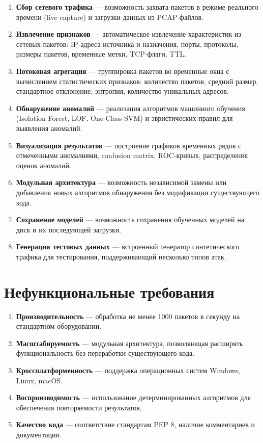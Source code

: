 \begin{enumerate}[label={\bfseries RF-\arabic*:}]
    \item \textbf{Сбор сетевого трафика} — возможность захвата пакетов в режиме реального времени (live capture) и загрузки данных из PCAP-файлов.
    \item \textbf{Извлечение признаков} — автоматическое извлечение характеристик из сетевых пакетов: IP-адреса источника и назначения, порты, протоколы, размеры пакетов, временные метки, TCP-флаги, TTL.
    \item \textbf{Потоковая агрегация} — группировка пакетов во временные окна с вычислением статистических признаков: количество пакетов, средний размер, стандартное отклонение, энтропия, количество уникальных адресов.
    \item \textbf{Обнаружение аномалий} — реализация алгоритмов машинного обучения (Isolation Forest, LOF, One-Class SVM) и эвристических правил для выявления аномалий.
    \item \textbf{Визуализация результатов} — построение графиков временных рядов с отмеченными аномалиями, confusion matrix, ROC-кривых, распределения оценок аномалий.
    \item \textbf{Модульная архитектура} — возможность независимой замены или добавления новых алгоритмов обнаружения без модификации существующего кода.
    \item \textbf{Сохранение моделей} — возможность сохранения обученных моделей на диск и их последующей загрузки.
    \item \textbf{Генерация тестовых данных} — встроенный генератор синтетического трафика для тестирования, поддерживающий несколько типов атак.
\end{enumerate}

\section{Нефункциональные требования}

\begin{enumerate}[label={\bfseries RNF-\arabic*:}]
    \item \textbf{Производительность} — обработка не менее 1000 пакетов в секунду на стандартном оборудовании.
    \item \textbf{Масштабируемость} — модульная архитектура, позволяющая расширять функциональность без переработки существующего кода.
    \item \textbf{Кроссплатформенность} — поддержка операционных систем Windows, Linux, macOS.
    \item \textbf{Воспроизводимость} — использование детерминированных алгоритмов для обеспечения повторяемости результатов.
    \item \textbf{Качество кода} — соответствие стандартам PEP 8, наличие комментариев и документации.
\end{enumerate}

